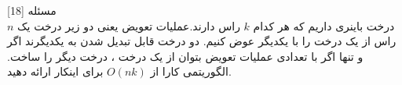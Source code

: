 ‌مسئله [18]
\\
$n$ درخت باینری داریم که هر کدام $k$ راس دارند.عملیات تعویض یعنی دو زیر درخت یک راس از یک درخت را با یکدیگر عوض کنیم. دو درخت قابل تبدیل شدن به یکدیگرند اگر و تنها اگر با تعدادی عملیات تعویض بتوان از یک درخت ، درخت دیگر را ساخت. الگوریتمی کارا از $O(nk)$ برای اینکار ارائه دهید.


% 
%
%
% 



\solution{
}


